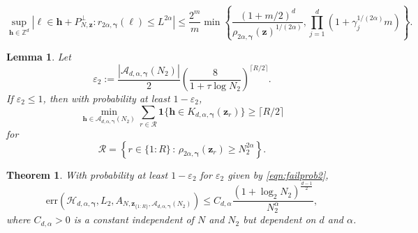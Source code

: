 \documentclass[10pt,a4paper]{amsart}
\newtheorem{lemma}{Lemma}
\newtheorem{theorem}{Theorem}
\newcommand{\Acal}{\mathcal{A}}
\newcommand{\Hcal}{\mathcal{H}}
\newcommand{\bsgamma}{\boldsymbol{\gamma}}
\newcommand{\bsh}{\boldsymbol{h}}
\newcommand{\bsl}{\boldsymbol{\ell}}
\newcommand{\bsone}{\boldsymbol{1}}
\newcommand{\bsz}{\boldsymbol{z}}
\begin{document}
\begin{equation}\label{fiber:bound}
\sup_{\bsh \in \mathbb{Z}^d} \left| \bsl \in \bsh + P^\perp_{N, \bsz} : r_{2 \alpha, \bsgamma}(\bsl) \le L^{2\alpha}  \right|  \le \frac{2^m}{m} \min \left\{ \frac{(1 + m/2)^d}{\rho_{2 \alpha, \bsgamma}(\bm{z})^{1/(2\alpha) }}, \prod_{j=1}^d (1 + \gamma_j^{1/(2\alpha) } m)  \right\}.
\end{equation}

\begin{lemma}\label{cor:whp2}
    Let 
    \begin{equation}\label{eqn:failprob2}
      \varepsilon_2:=\frac{|\Acal_{d,\alpha,\bsgamma}(N_2)|}{2}\left(\frac{8}{1+\tau\log N_2}\right)^{\lceil R/2 \rceil}.  
    \end{equation}
    If $\varepsilon_2\leq 1$, then with probability at least $1- \varepsilon_2$, 
    \[
      \min_{\bsh\in \Acal_{d,\alpha,\bsgamma}(N_2)} \sum_{r\in \mathcal{R}} \bsone\{\bsh\in K_{d,\alpha,\bsgamma}(\bsz_r)\}\geq \lceil R/2 \rceil
    \]
    for 
    \[
      \mathcal{R}=\left\{r\in \{1{:}R\} \,:\, \rho_{2\alpha, \bsgamma}(\bsz_r)\geq N^{2\alpha}_2 \right\}.
    \]
\end{lemma}

\begin{theorem}\label{thm:2}
With probability at least $1-\varepsilon_2$ for $\varepsilon_2$ given by \eqref{eqn:failprob2},
$$    \mathrm{err}(\Hcal_{d,\alpha,\bsgamma}, L_2,  A_{N,\bsz_{\{1{:}R\}},\Acal_{d,\alpha,\bsgamma}(N_2)}) \leq     C_{d, \alpha}  \frac{ (1+\log_2 N_2)^{\frac{d-1}{2}}}{N_2^{ \alpha}}, $$ where $C_{d, \alpha} > 0$ is a constant independent of $N$ and $N_2$ but dependent on $d$ and $\alpha$.
\end{theorem}
\end{document}

